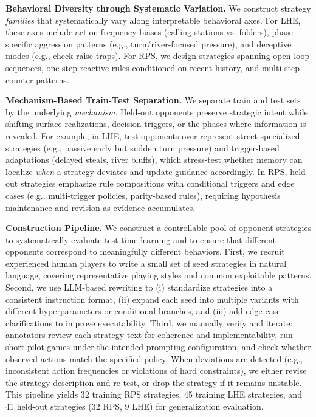 \documentclass{article}
\theoremstyle{plain}
\theoremstyle{definition}
\theoremstyle{remark}
\begin{document}
\textbf{Behavioral Diversity through Systematic Variation.}
We construct strategy \emph{families} that systematically vary along interpretable behavioral axes. For LHE, these axes include action-frequency biases (calling stations vs. folders), phase-specific aggression patterns (e.g., turn/river-focused pressure), and deceptive modes (e.g., check-raise traps). For RPS, we design strategies spanning open-loop sequences, one-step reactive rules conditioned on recent history, and multi-step counter-patterns.

\textbf{Mechanism-Based Train-Test Separation.}
We separate train and test sets by the underlying \emph{mechanism}. Held-out opponents preserve strategic intent while shifting surface realizations, decision triggers, or the phases where information is revealed. For example, in LHE, test opponents over-represent street-specialized strategies (e.g., passive early but sudden turn pressure) and trigger-based adaptations (delayed steals, river bluffs), which stress-test whether memory can localize \emph{when} a strategy deviates and update guidance accordingly. In RPS, held-out strategies emphasize rule compositions with conditional triggers and edge cases (e.g., multi-trigger policies, parity-based rules), requiring hypothesis maintenance and revision as evidence accumulates.

\textbf{Construction Pipeline.}
We construct a controllable pool of opponent strategies to systematically evaluate test-time learning and to ensure that different opponents correspond to meaningfully different behaviors. First, we recruit experienced human players to write a small set of seed strategies in natural language, covering representative playing styles and common exploitable patterns. Second, we use LLM-based rewriting to (i) standardize strategies into a consistent instruction format, (ii) expand each seed into multiple variants with different hyperparameters or conditional branches, and (iii) add edge-case clarifications to improve executability. Third, we manually verify and iterate: annotators review each strategy text for coherence and implementability, run short pilot games under the intended prompting configuration, and check whether observed actions match the specified policy. When deviations are detected (e.g., inconsistent action frequencies or violations of hard constraints), we either revise the strategy description and re-test, or drop the strategy if it remains unstable. This pipeline yields 32 training RPS strategies, 45 training LHE strategies, and 41 held-out strategies (32 RPS, 9 LHE) for generalization evaluation. 
\end{document}
